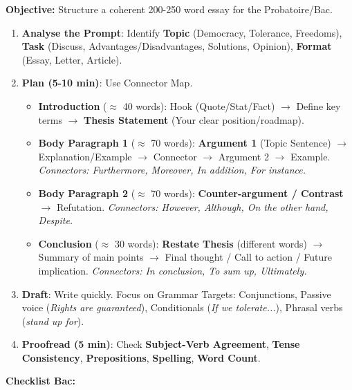 \documentclass[11pt]{article}
\newcommand{\cle}[1]{{\popxbold\color{popdark}#1}}
\begin{document}
\begin{methode}
    \textbf{Objective:} Structure a coherent 200-250 word essay for the Probatoire/Bac.
    \begin{enumerate}
        \item \textbf{Analyse the Prompt}: Identify \textbf{Topic} (Democracy, Tolerance, Freedoms), \textbf{Task} (Discuss, Advantages/Disadvantages, Solutions, Opinion), \textbf{Format} (Essay, Letter, Article).
        \item \textbf{Plan (5-10 min)}: Use \cle{Connector Map}.
              \begin{itemize}
                  \item \textbf{Introduction} ($\approx$ 40 words): Hook (Quote/Stat/Fact) $\to$ Define key terms $\to$ \textbf{Thesis Statement} (Your clear position/roadmap).
                  \item \textbf{Body Paragraph 1} ($\approx$ 70 words): \textbf{Argument 1} (Topic Sentence) $\to$ Explanation/Example $\to$ Connector $\to$ Argument 2 $\to$ Example. \textit{Connectors: Furthermore, Moreover, In addition, For instance.}
                  \item \textbf{Body Paragraph 2} ($\approx$ 70 words): \textbf{Counter-argument / Contrast} $\to$ Refutation. \textit{Connectors: However, Although, On the other hand, Despite.}
                  \item \textbf{Conclusion} ($\approx$ 30 words): \textbf{Restate Thesis} (different words) $\to$ Summary of main points $\to$ Final thought / Call to action / Future implication. \textit{Connectors: In conclusion, To sum up, Ultimately.}
              \end{itemize}
        \item \textbf{Draft}: Write quickly. Focus on \cle{Grammar Targets}: Conjunctions, Passive voice (\textit{Rights are guaranteed}), Conditionals (\textit{If we tolerate...}), Phrasal verbs (\textit{stand up for}).
        \item \textbf{Proofread (5 min)}: Check \textbf{Subject-Verb Agreement}, \textbf{Tense Consistency}, \textbf{Prepositions}, \textbf{Spelling}, \textbf{Word Count}.
    \end{enumerate}
    \textbf{Checklist Bac:}      
\end{methode}
\end{document}
